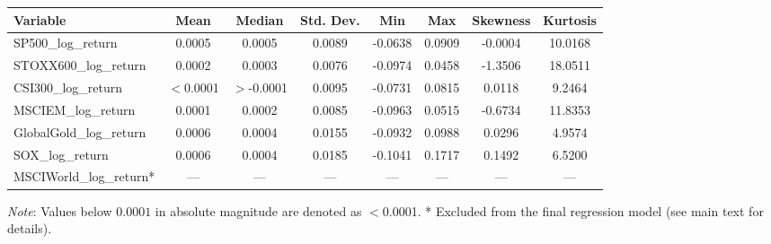 \begin{tabular}{lccccccc}
  \toprule
  \textbf{Variable} & \textbf{Mean} & \textbf{Median} & \textbf{Std. Dev.} & \textbf{Min} & \textbf{Max} & \textbf{Skewness} & \textbf{Kurtosis} \\ 
  \midrule
  SP500\_log\_return & 0.0005 & 0.0005 & 0.0089 & -0.0638 & 0.0909 & -0.0004 & 10.0168 \\ 
  STOXX600\_log\_return & 0.0002 & 0.0003 & 0.0076 & -0.0974 & 0.0458 & -1.3506 & 18.0511 \\ 
  CSI300\_log\_return & $<$0.0001 & $>$-0.0001 & 0.0095 & -0.0731 & 0.0815 & 0.0118 & 9.2464 \\ 
  MSCIEM\_log\_return & 0.0001 & 0.0002 & 0.0085 & -0.0963 & 0.0515 & -0.6734 & 11.8353 \\ 
  GlobalGold\_log\_return & 0.0006 & 0.0004 & 0.0155 & -0.0932 & 0.0988 & 0.0296 & 4.9574 \\ 
  SOX\_log\_return & 0.0006 & 0.0004 & 0.0185 & -0.1041 & 0.1717 & 0.1492 & 6.5200 \\ 
  MSCIWorld\_log\_return* & — & — & — & — & — & — & — \\ 
  \bottomrule
\end{tabular}
\par\vspace{4pt}
\begin{minipage}{\linewidth}
  \footnotesize \textit{Note}: Values below $0.0001$ in absolute magnitude are denoted as $<$0.0001. * Excluded from the final regression model (see main text for details).
\end{minipage}